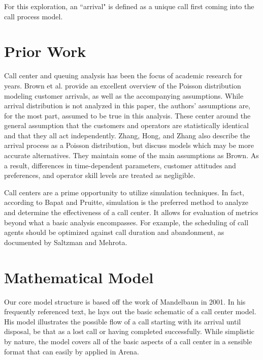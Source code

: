 \documentclass[12pt,twocolumn]{article}
\begin{document}
\par

For this exploration, an ``arrival" is defined as a unique call first coming into the call process model.



\section{Prior Work}

Call center and queuing analysis has been the focus of academic research for years.  Brown et al. provide an excellent overview of the Poisson distribution modeling customer arrivals, as well as the accompanying assumptions.  While arrival distribution is not analyzed in this paper, the authors' assumptions are, for the most part, assumed to be true in this analysis.  These center around the general assumption that the customers and operators are statistically identical and that they all act independently.\cite{brown}  Zhang, Hong, and Zhang also describe the arrival process as a Poisson distribution, but discuss models which may be more accurate alternatives.\cite{zhang}  They maintain some of the main assumptions as Brown.  As a result, differences in time-dependent parameters, customer attitudes and preferences, and operator skill levels are treated as negligible.
\par
Call centers are a prime opportunity to utilize simulation techniques.  In fact, according to Bapat and Pruitte, simulation is the preferred method to analyze and determine the effectiveness of a call center.\cite{bapat}  It allows for evaluation of metrics beyond what a basic analysis encompasses.  For example, the scheduling of call agents should be optimized against call duration and abandonment, as documented by Saltzman and Mehrota.\cite{saltzman}

\section{Mathematical Model}

Our core model structure is based off the work of Mandelbaun in 2001.  In his frequently referenced text, he lays out the basic schematic of a call center model.  His model illustrates the possible flow of a call starting with its arrival until disposal, be that as a lost call or having completed successfully.\cite{mandelbaun}  While simplistic by nature, the model covers all of the basic aspects of a call center in a sensible format that can easily by applied in Arena.  
\end{document}
